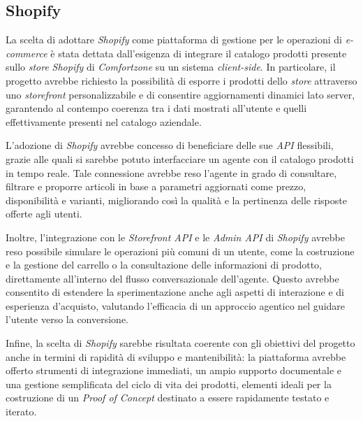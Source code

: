 \subsection{Shopify}

La scelta di adottare \emph{Shopify} come piattaforma di gestione per le operazioni di \emph{e-commerce} è stata dettata dall’esigenza di integrare il catalogo prodotti presente 
sullo \emph{store} \emph{Shopify} di \emph{Comfortzone} su un sistema \emph{client-side}. In particolare, il progetto avrebbe richiesto la possibilità di esporre i prodotti dello \emph{store} 
attraverso uno \emph{storefront} personalizzabile e di consentire aggiornamenti dinamici lato server, garantendo al contempo coerenza tra i dati mostrati all’utente e quelli effettivamente 
presenti nel catalogo aziendale.

L’adozione di \emph{Shopify} avrebbe concesso di beneficiare delle sue \emph{API} flessibili, grazie alle quali si sarebbe potuto interfacciare un agente con il catalogo prodotti in tempo reale. 
Tale connessione avrebbe reso l’agente in grado di consultare, filtrare e proporre articoli in base a parametri aggiornati come prezzo, disponibilità e varianti, 
migliorando così la qualità e la pertinenza delle risposte offerte agli utenti.

Inoltre, l’integrazione con le \emph{Storefront API} e le \emph{Admin API} di \emph{Shopify} avrebbe reso possibile simulare le operazioni più comuni di un utente, come la 
costruzione e la gestione del carrello o la consultazione delle informazioni di prodotto, direttamente all’interno del flusso conversazionale dell’agente. Questo avrebbe consentito di 
estendere la sperimentazione anche agli aspetti di interazione e di esperienza d’acquisto, valutando l’efficacia di un approccio agentico nel guidare l’utente verso la conversione.

Infine, la scelta di \emph{Shopify} sarebbe risultata coerente con gli obiettivi del progetto anche in termini di rapidità di sviluppo e mantenibilità: 
la piattaforma avrebbe offerto strumenti di integrazione immediati, un ampio supporto documentale e una gestione semplificata del ciclo di vita dei prodotti, 
elementi ideali per la costruzione di un \emph{Proof of Concept} destinato a essere rapidamente testato e iterato.
